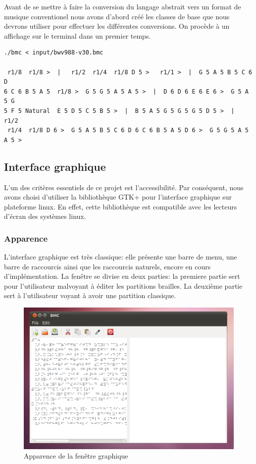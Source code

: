 Avant de se mettre à faire la conversion du langage abstrait vers un format de musique conventionel nous avons d'abord créé les classes de base que nous devrons utiliser pour effectuer les différentes conversions. On procède à un affichage sur le terminal dans un premier temps.

\begin{verbatim}
./bmc < input/bwv988-v30.bmc 

 r1/8  r1/8 >  |   r1/2  r1/4  r1/8 D 5 >   r1/1 >  |  G 5 A 5 B 5 C 6 D 
6 C 6 B 5 A 5  r1/8 >  G 5 G 5 A 5 A 5 >  |  D 6 D 6 E 6 E 6 >  G 5 A 5 G 
5 F 5 Natural  E 5 D 5 C 5 B 5 >  |  B 5 A 5 G 5 G 5 G 5 D 5 >  |   r1/2 
 r1/4  r1/8 D 6 >  G 5 A 5 B 5 C 6 D 6 C 6 B 5 A 5 D 6 >  G 5 G 5 A 5 A 5 > 
\end{verbatim}

\subsection{Interface graphique}

L'un des critères essentiels de ce projet est l'accessibilité. Par
conséquent, nous avons choisi d'utiliser la bibliothèque GTK+ pour
l'interface graphique sur plateforme linux. En effet, cette
bibliothèque est compatible avec les lecteurs d'écran des systèmes
linux.


\subsubsection*{Apparence}
L'interface graphique est très classique: elle présente une barre de
menu, une barre de raccourcis ainsi que les raccourcis naturels,
encore en cours d'implémentation. La fenêtre se divise en deux
parties: la premiere partie sert pour l'utilisateur malvoyant à éditer les partitions brailles. La
deuxième partie sert à l'utilisateur voyant à avoir une partition
classique.

\begin{center}
\begin{figure}[hbtp]
  \includegraphics[width=1\textwidth]{images/linux_gui.png}
  \caption{Apparence de la fenêtre graphique}
\end{figure}
\end{center}



